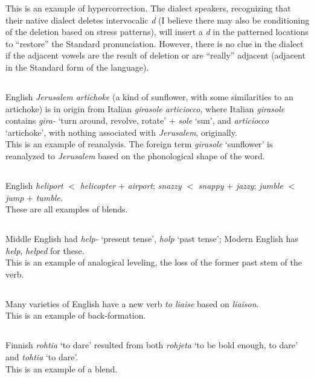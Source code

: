 \documentclass[12pt]{article}
\begin{document}
This is an example of hypercorrection. The dialect speakers, recognizing that their native dialect deletes intervocalic {\it d} (I believe there may also be conditioning of the deletion based on stress patterns), will insert a {\it d} in the patterned locations to ``restore'' the Standard pronunciation. However, there is no clue in the dialect if the adjacent vowels are the result of deletion or are ``really'' adjacent (adjacent in the Standard form of the language).

\setcounter{subsection}{5}
\subsection{}
English {\it Jerusalem artichoke} (a kind of sunflower, with some similarities to an artichoke) is in origin from Italian {\it girasole articiocco}, where Italian {\it girasole}  contains {\it gira-} `turn around, revolve, rotate' + {\it sole} `sun', and {\it articiocco} `artichoke', with nothing associated with {\it Jerusalem}, originally. \\

This is an example of reanalysis. The foreign term {\it girasole} `sunflower' is reanalyzed to {\it Jerusalem} based on the phonological shape of the word. 

\setcounter{subsection}{7}
\subsection{}
English {\it heliport} $<$ {\it helicopter} $+$ {\it airport}; {\it snazzy} $<$ {\it snappy} $+$ {\it jazzy}; {\it jumble} $<$ {\it jump} $+$ {\it tumble}. \\

These are all examples of blends.

\setcounter{subsection}{9}
\subsection{}
Middle English had {\it help-} `present tense', {\it holp} `past tense'; Modern English has {\it help}, {\it helped} for these. \\

This is an example of analogical leveling, the loss of the former past stem of the verb.

\setcounter{subsection}{11}
\subsection{}
Many varieties of English have a new verb {\it to liaise} based on {\it liaison}. \\

This is an example of back-formation.

\setcounter{subsection}{13}
\subsection{}
Finnish {\it rohtia} `to dare' resulted from both {\it rohjeta} `to be bold enough, to dare' and {\it tohtia} `to dare'. \\

This is an example of a blend.
\end{document}
